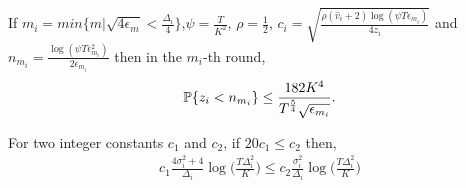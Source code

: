 \begin{lemma}
\label{proofTheorem:Lemma:5}
If $m_i = min\lbrace m|\sqrt{4\epsilon_{m} } < \frac{\Delta_i}{4} \rbrace $,$\psi=\frac{T}{ K^2}$, $\rho=\frac{1}{2}$, $c_{i} =\sqrt{\frac{\rho (\hat{v}_i + 2)\log (\psi T\epsilon_{m_{i}})}{4 z_i}}$ and $n_{m_i}=\frac{\log{(\psi T\epsilon_{m_{i}}^{2})}}{2\epsilon_{m_{i}}}$ then in the $m_i$-th round, 
\begin{align*}
\mathbb{P}\lbrace z_i < n_{m_i} \rbrace  \leq \dfrac{182 K^4}{T^{\frac{5}{4}}\sqrt{\epsilon_{m_i}}}.
\end{align*}
\end{lemma}









\begin{lemma}
\label{proofTheorem:Lemma:6}
For two integer constants $c_1$ and $c_2$, if $20 c_1 \leq c_2$ then,
\begin{align*}
c_1 \frac{4\sigma_i^2 + 4}{\Delta_i}\log\bigg( \frac{T\Delta_i^2}{K}\bigg) \leq c_2 \frac{\sigma_i^2}{\Delta_i}\log\bigg( \frac{T\Delta_i^2}{K}\bigg)
\end{align*}
\end{lemma}


%
%


